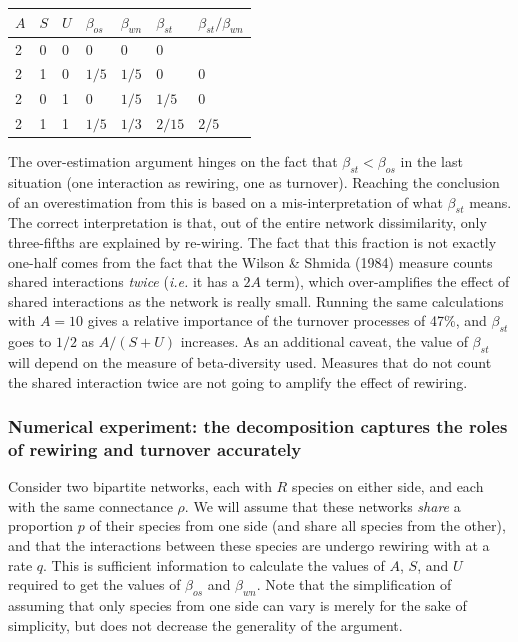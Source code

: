 \documentclass[11pt]{article}
\begin{document}
\begin{longtable}[]{@{}lllllll@{}}
\toprule
\(A\) & \(S\) & \(U\) & \(\beta_{os}\) & \(\beta_{wn}\) & \(\beta_{st}\)
& \(\beta_{st}/\beta_{wn}\)\tabularnewline
\midrule
\endhead
2 & 0 & 0 & 0 & 0 & 0 &\tabularnewline
2 & 1 & 0 & \(1/5\) & \(1/5\) & 0 & 0\tabularnewline
2 & 0 & 1 & 0 & \(1/5\) & \(1/5\) & 0\tabularnewline
2 & 1 & 1 & \(1/5\) & \(1/3\) & \(2/15\) & \(2/5\)\tabularnewline
\bottomrule
\end{longtable}

The over-estimation argument hinges on the fact that
\(\beta_{st} < \beta_{os}\) in the last situation (one interaction as
rewiring, one as turnover). Reaching the conclusion of an overestimation
from this is based on a mis-interpretation of what \(\beta_{st}\) means.
The correct interpretation is that, out of the entire network
dissimilarity, only three-fifths are explained by re-wiring. The fact
that this fraction is not exactly one-half comes from the fact that the
Wilson \& Shmida (1984) measure counts shared interactions \emph{twice}
(\emph{i.e.} it has a \(2A\) term), which over-amplifies the effect of
shared interactions as the network is really small. Running the same
calculations with \(A = 10\) gives a relative importance of the turnover
processes of 47\%, and \(\beta_{st}\) goes to \(1/2\) as \(A/(S+U)\)
increases. As an additional caveat, the value of \(\beta_{st}\) will
depend on the measure of beta-diversity used. Measures that do not count
the shared interaction twice are not going to amplify the effect of
rewiring.

\hypertarget{numerical-experiment-the-decomposition-captures-the-roles-of-rewiring-and-turnover-accurately}{%
\subsubsection{Numerical experiment: the decomposition captures the
roles of rewiring and turnover
accurately}\label{numerical-experiment-the-decomposition-captures-the-roles-of-rewiring-and-turnover-accurately}}

Consider two bipartite networks, each with \(R\) species on either side,
and each with the same connectance \(\rho\). We will assume that these
networks \emph{share} a proportion \(p\) of their species from one side
(and share all species from the other), and that the interactions
between these species are undergo rewiring with at a rate \(q\). This is
sufficient information to calculate the values of \(A\), \(S\), and
\(U\) required to get the values of \(\beta_{os}\) and \(\beta_{wn}\).
Note that the simplification of assuming that only species from one side
can vary is merely for the sake of simplicity, but does not decrease the
generality of the argument.
\end{document}
